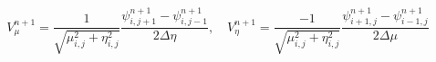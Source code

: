 \documentclass{article}
\begin{document}
\begin{equation}
V_\mu^{n+1}=\frac{1}{\sqrt{\mu_{i,j}^2+\eta_{i,j}^2}} \frac{\psi_{i,j+1}^{n+1} - \psi_{i,j-1}^{n+1}}{2\Delta \eta}, \quad V_\eta^{n+1}=\frac{-1}{\sqrt{\mu_{i,j}^2+\eta_{i,j}^2}} \frac{\psi_{i+1,j}^{n+1} - \psi_{i-1,j}^{n+1}}{2\Delta \mu}
\end{equation}
\end{document}
